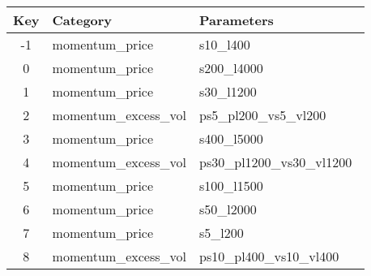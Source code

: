 \begin{tabular}{c|ll}

Key & Category & Parameters \\
\hline
-1 & momentum\_price&s10\_l400\ \\
0 & momentum\_price&s200\_l4000\ \\
1 & momentum\_price&s30\_l1200\ \\
2 & momentum\_excess\_vol&ps5\_pl200\_vs5\_vl200\ \\
3 & momentum\_price&s400\_l5000\ \\
4 & momentum\_excess\_vol&ps30\_pl1200\_vs30\_vl1200\ \\
5 & momentum\_price&s100\_l1500\ \\
6 & momentum\_price&s50\_l2000\ \\
7 & momentum\_price&s5\_l200\ \\
8 & momentum\_excess\_vol&ps10\_pl400\_vs10\_vl400\ \\

\end{tabular}